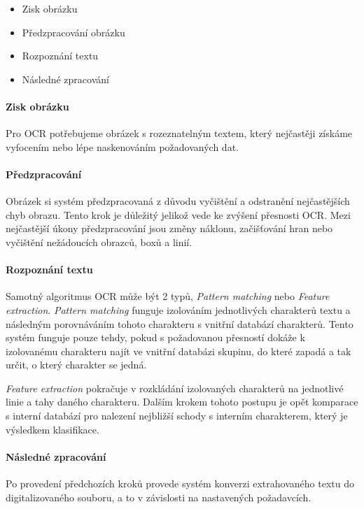 \documentclass[journal]{IEEEtran}
\begin{document}
\begin{itemize}
 \item Zisk obrázku
 \item Předzpracování obrázku
 \item Rozpoznání textu
 \item Následné zpracování
\end{itemize}

\paragraph{Zisk obrázku}
Pro \ac{OCR} potřebujeme obrázek s rozeznatelným textem, který nejčastěji získáme vyfocením nebo lépe naskenováním požadovaných dat.

\paragraph{Předzpracování}
Obrázek si systém předzpracovaná z důvodu vyčištění a odstranění nejčastějších chyb obrazu.
Tento krok je důležitý jelikož vede ke zvýšení přesnosti \ac{OCR}.
Mezi nejčastější úkony předzpracování jsou změny náklonu, začišťování hran nebo vyčištění nežádoucích obrazců, boxů a linií.

\paragraph{Rozpoznání textu}
Samotný algoritmus \ac{OCR} může být 2 typů, \textit {Pattern matching} nebo \textit{Feature extraction}.
\textit{Pattern matching} funguje izolováním jednotlivých charakterů textu a následným porovnáváním tohoto charakteru s vnitřní databází charakterů. Tento systém funguje pouze tehdy, pokud s požadovanou přesností dokáže k izolovanému charakteru najít ve vnitřní databázi skupinu, do které zapadá a tak určit, o který charakter se jedná.

\textit{Feature extraction} pokračuje v rozkládání izolovaných charakterů na jednotlivé linie a tahy daného charakteru. Dalším krokem tohoto postupu je opět komparace s interní databází pro nalezení nejbližší schody s interním charakterem, který je výsledkem klasifikace.

\paragraph{Následné zpracování}
Po provedení předchozích kroků provede systém konverzi extrahovaného textu do digitalizovaného souboru, a to v závislosti na nastavených požadavcích.
\end{document}
